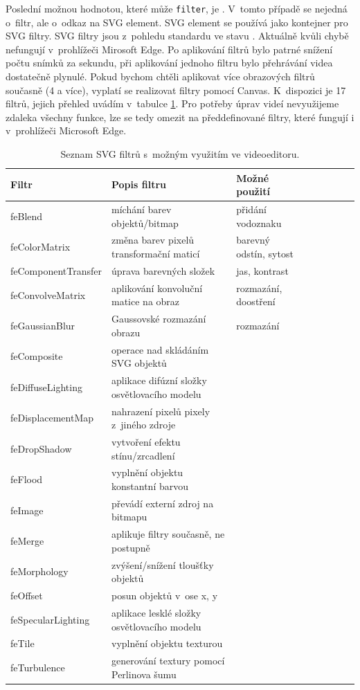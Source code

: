 Poslední možnou hodnotou, které může \texttt{filter}, je . V~tomto případě se nejedná o~filtr, ale o~odkaz na SVG element. SVG element se používá jako kontejner pro SVG filtry. SVG filtry jsou z~pohledu standardu ve stavu . Aktuálně kvůli chybě nefungují v~prohlížeči Mirosoft Edge. Po aplikování filtrů bylo patrné snížení počtu snímků za sekundu, při aplikování jednoho filtru bylo přehrávání videa dostatečně plynulé. Pokud bychom chtěli aplikovat více obrazových filtrů současně (4 a více), vyplatí se realizovat filtry pomocí Canvas. K~dispozici je 17 filtrů, jejich přehled uvádím v~tabulce \ref{tab:svg}. Pro potřeby úprav videí nevyužijeme zdaleka všechny funkce, lze se tedy omezit na předdefinované filtry, které fungují i v~prohlížeči Microsoft Edge.
\begin{table}[h]
    \centering
    \begin{tabular}{|l|l|l|l|l|l|l|l|}
    \hline
    Filtr   & Popis filtru & Možné použití \\
    \hline
    feBlend & míchání barev objektů/bitmap & přidání vodoznaku \\
    feColorMatrix & změna barev pixelů transformační maticí & barevný odstín, sytost \\
    feComponentTransfer & úprava barevných složek & jas, kontrast \\
    feConvolveMatrix & aplikování konvoluční matice na obraz & rozmazání, doostření \\
    feGaussianBlur & Gaussovské rozmazání obrazu & rozmazání \\
    feComposite & operace nad skládáním SVG objektů & \\
    feDiffuseLighting & aplikace difúzní složky osvětlovacího modelu & \\
    feDisplacementMap & nahrazení pixelů pixely z~jiného zdroje & \\
    feDropShadow & vytvoření efektu stínu/zrcadlení & \\
    feFlood & vyplnění objektu konstantní barvou & \\
    feImage & převádí externí zdroj na bitmapu & \\
    feMerge & aplikuje filtry současně, ne postupně & \\
    feMorphology & zvýšení/snížení tloušťky objektů & \\
    feOffset & posun objektů v~ose x, y & \\
    feSpecularLighting & aplikace lesklé složky osvětlovacího modelu & \\
    feTile & vyplnění objektu texturou & \\
    feTurbulence & generování textury pomocí Perlinova šumu & \\
    \hline
    \end{tabular}
    \caption{Seznam SVG filtrů s~možným využitím ve videoeditoru.}
    \label{tab:svg}
\end{table}

